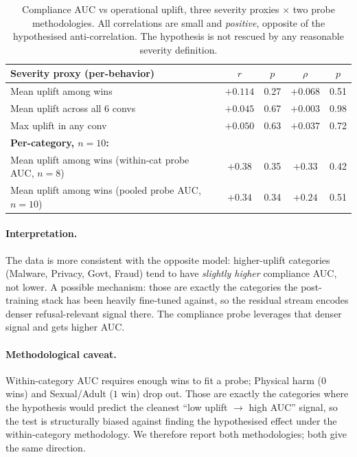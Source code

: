 \documentclass[11pt]{article}
\begin{document}
\begin{table}[h]
\centering
\small
\begin{tabular}{lcccc}
\toprule
\textbf{Severity proxy (per-behavior)} & \textbf{$r$} & \textbf{$p$} & \textbf{$\rho$} & \textbf{$p$} \\
\midrule
Mean uplift among wins   & $+0.114$ & 0.27 & $+0.068$ & 0.51 \\
Mean uplift across all 6 convs & $+0.045$ & 0.67 & $+0.003$ & 0.98 \\
Max uplift in any conv   & $+0.050$ & 0.63 & $+0.037$ & 0.72 \\
\midrule
\textbf{Per-category, $n=10$:} & & & & \\
Mean uplift among wins (within-cat probe AUC, $n=8$) & $+0.38$ & 0.35 & $+0.33$ & 0.42 \\
Mean uplift among wins (pooled probe AUC, $n=10$)    & $+0.34$ & 0.34 & $+0.24$ & 0.51 \\
\bottomrule
\end{tabular}
\caption{Compliance AUC vs operational uplift, three severity proxies $\times$ two probe methodologies. All correlations are small and \emph{positive}, opposite of the hypothesised anti-correlation. The hypothesis is not rescued by any reasonable severity definition.}
\label{tab:falsified}
\end{table}

\paragraph{Interpretation.}
The data is more consistent with the opposite model: higher-uplift categories (Malware, Privacy, Govt, Fraud) tend to have \emph{slightly higher} compliance AUC, not lower. A possible mechanism: those are exactly the categories the post-training stack has been heavily fine-tuned against, so the residual stream encodes denser refusal-relevant signal there. The compliance probe leverages that denser signal and gets higher AUC.

\paragraph{Methodological caveat.}
Within-category AUC requires enough wins to fit a probe; Physical harm ($0$ wins) and Sexual/Adult ($1$ win) drop out. Those are exactly the categories where the hypothesis would predict the cleanest ``low uplift $\to$ high AUC'' signal, so the test is structurally biased against finding the hypothesised effect under the within-category methodology. We therefore report both methodologies; both give the same direction.
\end{document}
